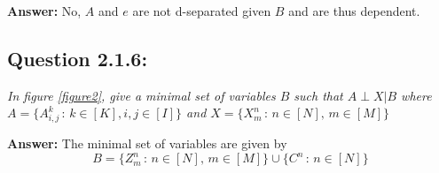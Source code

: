 \textbf{Answer:} No, $A$ and $e$ are not d-separated given $B$ and are thus dependent.

\subsection*{Question 2.1.6:}
\textit{In figure \ref{figure2}, give a minimal set of variables $B$ such that $A \perp X | B$ where $A = \{ A^k_{i,j} \, : \, k \in [K], i,j \in [I] \} $ and $X = \{ X_m^n \, : \, n \in [N], \, m \in [M] \}$}

\textbf{Answer:} The minimal set of variables are given by $$B = \{ Z_m^n \, : \, n \in [N], \, m \in [M] \} \cup \{ C^n \, : \, n \in [N] \} $$
